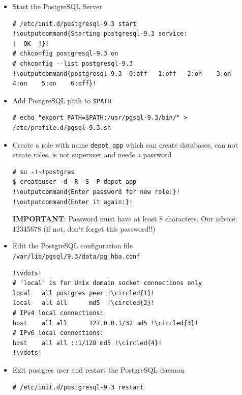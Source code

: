 \documentclass{beamer}
\newcommand*\circled[1]{\tikz[baseline=(char.base)]{
            \node[shape=circle,draw,inner sep=2pt] (char) {#1};}}
\newcommand{\outputcommand}[1]{\color{darkgreen}{#1}}
\begin{document}
\begin{frame}
\begin{itemize}
\lstset{language=shell, escapechar=!}Finally \dots
\begin{lstlisting}[escapechar=!]
# ls /var/lib/pgsql/9.3/data/*
!\outputcommand{A lot of stuff}!
\end{lstlisting}

\item Start the PostgreSQL Server

\lstset{language=shell, escapechar=!}
\begin{lstlisting}[escapechar=!]
# /etc/init.d/postgresql-9.3 start
!\outputcommand{Starting postgresql-9.3 service:                           [  OK  ]}!
# chkconfig postgresql-9.3 on
# chkconfig --list postgresql-9.3
!\outputcommand{postgresql-9.3 	0:off	1:off	2:on	3:on	4:on	5:on	6:off}!
\end{lstlisting}

\item Add PostgreSQL path to \texttt{\$PATH}

\lstset{language=shell, escapechar=!}
\begin{lstlisting}[escapechar=!]
# echo "export PATH=$PATH:/usr/pgsql-9.3/bin/" > /etc/profile.d/pgsql-9.3.sh
\end{lstlisting}

\item Create a role with name \texttt{depot\_app} which can create databases, can not create roles, is not superuser and needs a password

\lstset{language=shell}
\begin{lstlisting}[escapechar=!]
# su -!~!postgres
$ createuser -d -R -S -P depot_app
!\outputcommand{Enter password for new role:}!
!\outputcommand{Enter it again:}!
\end{lstlisting}
\textbf{IMPORTANT}: Password must have at least 8 characters. Our advice: 12345678 (if not, don`t forget this password!!)

\item Edit the PostgreSQL configuration file \texttt{/var/lib/pgsql/9.3/data/pg\_hba.conf}

\lstset{language=shell, escapechar=!, numbers=left}
\begin{lstlisting}[escapechar=!]
!\vdots!
# "local" is for Unix domain socket connections only
local   all postgres peer !\circled{1}!
local   all all      md5  !\circled{2}!
# IPv4 local connections:
host    all all      127.0.0.1/32 md5 !\circled{3}!
# IPv6 local connections:
host    all all ::1/128 md5 !\circled{4}!
!\vdots!
\end{lstlisting}

\item Exit postgres user and restart the PostgreSQL daemon

\lstset{language=shell, escapechar=!}
\begin{lstlisting}[escapechar=!]
# /etc/init.d/postgresql-9.3 restart
\end{lstlisting}

\end{itemize}
\end{frame}
\end{document}
